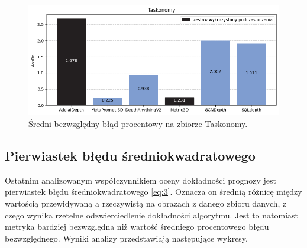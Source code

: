 \begin{figure}[H]
    \centering
    \includegraphics{plots/absrel/6}
    \caption{Średni bezwzględny błąd procentowy na zbiorze Taskonomy.}
    \label{fig:absrel_6}
\end{figure}

\subsection{Pierwiastek błędu średniokwadratowego}
Ostatnim analizowanym współczynnikiem oceny dokładności prognozy jest pierwiastek błędu średniokwadratowego \ref{eq:3}. Oznacza on średnią różnicę między wartością przewidywaną a rzeczywistą na obrazach z danego zbioru danych, z czego wynika rzetelne odzwierciedlenie dokładności algorytmu. Jest to natomiast metryka bardziej bezwzględna niż wartość średniego procentowego błędu bezwzględnego. Wyniki analizy przedstawiają następujące wykresy.

